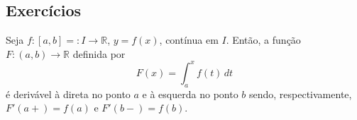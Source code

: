\subsection*{Exercícios}

\begin{exer}
  Seja $f:[a, b]=:I\to\mathbb{R}$, $y=f(x)$, contínua em $I$. Então, a função $F:(a, b)\to\mathbb{R}$ definida por
  \begin{equation}
    F(x) = \int_a^x f(t)\,dt
  \end{equation}
é derivável à direta no ponto $a$ e à esquerda no ponto $b$ sendo, respectivamente, $F'(a+) = f(a)$ e $F'(b-) = f(b)$.
\end{exer}